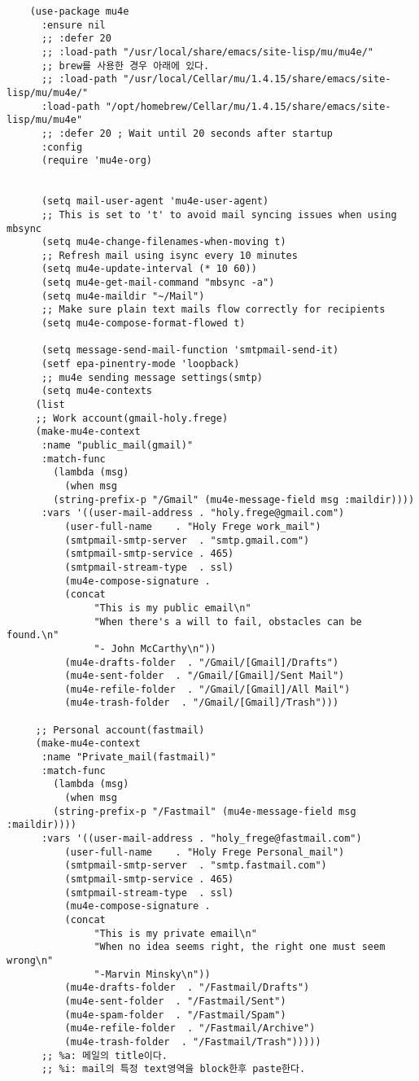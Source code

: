 \documentclass[11pt]{article}
\begin{document}
\begin{verbatim}
    (use-package mu4e			
      :ensure nil
      ;; :defer 20
      ;; :load-path "/usr/local/share/emacs/site-lisp/mu/mu4e/"
      ;; brew를 사용한 경우 아래에 있다.
      ;; :load-path "/usr/local/Cellar/mu/1.4.15/share/emacs/site-lisp/mu/mu4e/"
      :load-path "/opt/homebrew/Cellar/mu/1.4.15/share/emacs/site-lisp/mu/mu4e"
      ;; :defer 20 ; Wait until 20 seconds after startup
      :config
      (require 'mu4e-org)


      (setq mail-user-agent 'mu4e-user-agent)
      ;; This is set to 't' to avoid mail syncing issues when using mbsync
      (setq mu4e-change-filenames-when-moving t)
      ;; Refresh mail using isync every 10 minutes
      (setq mu4e-update-interval (* 10 60))
      (setq mu4e-get-mail-command "mbsync -a")
      (setq mu4e-maildir "~/Mail")
      ;; Make sure plain text mails flow correctly for recipients
      (setq mu4e-compose-format-flowed t)

      (setq message-send-mail-function 'smtpmail-send-it)
      (setf epa-pinentry-mode 'loopback)
      ;; mu4e sending message settings(smtp)
      (setq mu4e-contexts
	 (list
	 ;; Work account(gmail-holy.frege)
	 (make-mu4e-context
	  :name "public_mail(gmail)"
	  :match-func
	    (lambda (msg)
	      (when msg
		(string-prefix-p "/Gmail" (mu4e-message-field msg :maildir))))
	  :vars '((user-mail-address . "holy.frege@gmail.com")
		  (user-full-name    . "Holy Frege work_mail")
		  (smtpmail-smtp-server  . "smtp.gmail.com")
		  (smtpmail-smtp-service . 465)
		  (smtpmail-stream-type  . ssl)
		  (mu4e-compose-signature .
		  (concat 
		       "This is my public email\n"
		       "When there's a will to fail, obstacles can be found.\n"
		       "- John McCarthy\n"))
		  (mu4e-drafts-folder  . "/Gmail/[Gmail]/Drafts")
		  (mu4e-sent-folder  . "/Gmail/[Gmail]/Sent Mail")
		  (mu4e-refile-folder  . "/Gmail/[Gmail]/All Mail")
		  (mu4e-trash-folder  . "/Gmail/[Gmail]/Trash")))

	 ;; Personal account(fastmail)
	 (make-mu4e-context
	  :name "Private_mail(fastmail)"
	  :match-func
	    (lambda (msg)
	      (when msg
		(string-prefix-p "/Fastmail" (mu4e-message-field msg :maildir))))
	  :vars '((user-mail-address . "holy_frege@fastmail.com")
		  (user-full-name    . "Holy Frege Personal_mail")
		  (smtpmail-smtp-server  . "smtp.fastmail.com")
		  (smtpmail-smtp-service . 465)
		  (smtpmail-stream-type  . ssl)
		  (mu4e-compose-signature .
		  (concat 
		       "This is my private email\n"
		       "When no idea seems right, the right one must seem wrong\n"
		       "-Marvin Minsky\n"))
		  (mu4e-drafts-folder  . "/Fastmail/Drafts")
		  (mu4e-sent-folder  . "/Fastmail/Sent")
		  (mu4e-spam-folder  . "/Fastmail/Spam")
		  (mu4e-refile-folder  . "/Fastmail/Archive")
		  (mu4e-trash-folder  . "/Fastmail/Trash")))))
      ;; %a: 메일의 title이다.
      ;; %i: mail의 특정 text영역을 block한후 paste한다. 


\end{verbatim}
\end{document}

